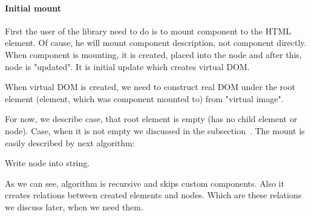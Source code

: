 \documentclass[oneside, 12pt]{book}
\begin{document}
      \paragraph{Initial mount}\label{par:our-architecture-rendering-browser-init} 
        First the user of the library need to do is to mount component to the HTML element. 
        Of cause, he will mount component description, not component directly.
        When component is mounting, it is created, placed into the node and after this, node is "updated". 
        It is initial update which creates virtual DOM. 

        When virtual DOM is created, we need to construct real DOM under the root element 
        (element, which was component mounted to) from "virtual image".

        For now, we describe case, that root element is empty (has no child element or node).
        Case, when it is not empty we discussed in the subsection~.
        The mount is easily described by next algorithm:
        \begin{algorithm}[H]
          \caption{Write node into string.}
        \end{algorithm}

        As we can see, algorithm is recursive and skips custom components. 
        Also it creates relations between created elements and nodes. 
        Which are these relations we discuss later, when we need them.
\end{document}
